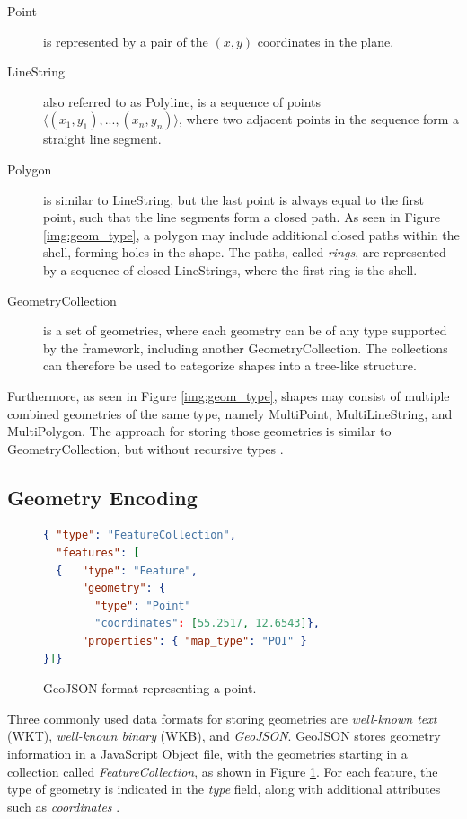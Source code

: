 \begin{description}
    \item[Point] is represented by a pair of the $(x, y)$ coordinates in the plane.
\item[LineString] also referred to as Polyline, is a sequence of points $\langle(x_1,y_1), ..., (x_n,y_n)\rangle$, where two adjacent points in the sequence form a straight line segment.

\item[Polygon] is similar to LineString, but the last point is always equal to the first point, such that the line segments form a closed path. As seen in Figure \ref{img:geom_type}, a polygon may include additional closed paths within the shell, forming holes in the shape. The paths, called \emph{rings}, are represented by a sequence of closed LineStrings, where the first ring is the shell.

\item[GeometryCollection] is a set of geometries, where each geometry can be of any type supported by the framework, including another GeometryCollection. The collections can therefore be used to categorize shapes into a tree-like structure.
\end{description}

Furthermore, as seen in Figure \ref{img:geom_type}, shapes may consist of multiple combined geometries of the same type, namely MultiPoint, MultiLineString, and MultiPolygon. The approach for storing those geometries is similar to GeometryCollection, but without recursive types \cite{spatialparquet}.


\subsection{Geometry Encoding}

\begin{figure}[htbp]
    \centering
\begin{lstlisting}[language=json,firstnumber=1,basicstyle=\footnotesize\ttfamily]
{ "type": "FeatureCollection",
  "features": [
  {   "type": "Feature",
      "geometry": {
        "type": "Point"
        "coordinates": [55.2517, 12.6543]},
      "properties": { "map_type": "POI" }
}]}
\end{lstlisting}
\caption{GeoJSON format representing a point.}
    \label{fig:geojson}
\end{figure}



Three commonly used data formats for storing geometries are \textit{well-known text} (WKT), \textit{well-known binary} (WKB), and \textit{GeoJSON}. GeoJSON stores geometry information in a JavaScript Object file, with the geometries starting in a collection called \textit{FeatureCollection}, as shown in Figure \ref{fig:geojson}. For each feature, the type of geometry is indicated in the \textit{type} field, along with additional attributes such as \textit{coordinates} \cite{GeoJSON}.


